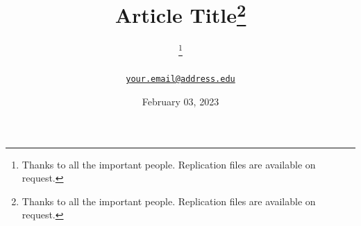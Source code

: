 \documentclass[
<<<<<<< HEAD:inst/rmarkdown/templates/z-article/skeleton/skeleton.tex
11pt
twocolumn
]{article}
\makeatletter
\providecommand{\subtitle}[1]{%
  \apptocmd{\@title}{\par {\large #1 \par}}{}{}}
\providecommand{\subtitle}[1]{%
  \apptocmd{\@title}{\par {\large #1 \par}}{}{}
}
\makeatother
\begin{document}
\pretitle{\begin{center}\Huge\bfseries} %
\posttitle{\end{center}} %
\title{Article Title\thanks{Thanks to all the important people.
Replication files are available on request.}}
\providecommand{\subtitle}[1]{}
\subtitle{Subtitle}
\author{%
\textsc{}\thanks{Thanks to all the important people. Replication files
are available on request.} \\[1ex] %
\normalsize  \\ %
\normalsize \href{mailto:\href{mailto:your.email@address.edu}{\nolinkurl{your.email@address.edu}}}{\href{mailto:your.email@address.edu}{\nolinkurl{your.email@address.edu}}} %
}
\date{February 03, 2023} %
\renewcommand{\maketitlehookd}{%
>>>>>>> 68f0abee1e0db71c1f585da2585915c8eb49dbf6:inst/rmarkdown/templates/zarticle/skeleton/skeleton.tex
\begin{abstract}
Lorem ipsum dolor sit amet, consectetur adipiscing elit. Donec sit amet
libero justo. Pellentesque eget nibh ex. Aliquam tincidunt egestas
lectus id ullamcorper. Proin tellus orci, posuere sed cursus at,
bibendum ac odio. Nam consequat non ante eget aliquam. Nulla facilisis
tincidunt elit. Nunc hendrerit pellentesque quam, eu imperdiet ipsum
porttitor ut. Interdum et malesuada fames ac ante ipsum primis in
faucibus. Suspendisse potenti. Duis vitae nibh mauris. Duis nec sem sit
amet ante dictum mattis. Suspendisse diam velit, maximus eget commodo
at, faucibus et nisi. Ut a pellentesque eros, sit amet suscipit eros.
Nunc tincidunt quis risus suscipit vestibulum. Quisque eu fringilla
<<<<<<< HEAD:inst/rmarkdown/templates/z-article/skeleton/skeleton.tex
massa. \clearpage
\end{abstract}
=======
massa.
\end{abstract}
}
\end{document}
